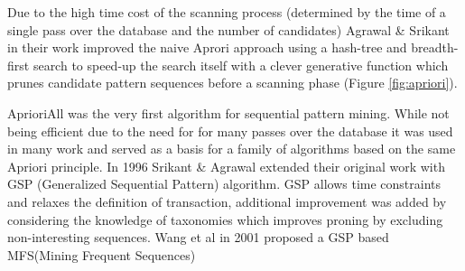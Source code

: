Due to the high time cost of the scanning process (determined by the time of a single pass over the database and the number of candidates)  Agrawal \& Srikant in their work improved the naive Aprori approach using a hash-tree and breadth-first search to speed-up the search itself with a clever generative function which prunes candidate pattern sequences before a scanning phase (Figure \ref{fig:apriori}). 

AprioriAll was the very first algorithm for sequential pattern mining. While not being efficient due to the need for for many passes over the database it was used in many work and served as a basis for a family of algorithms based on the same Apriori principle. In 1996 Srikant \& Agrawal extended their original work with GSP (Generalized Sequential Pattern) algorithm. GSP allows time constraints and relaxes the definition of transaction, additional improvement was added by considering the knowledge of taxonomies which improves proning by excluding non-interesting sequences. Wang et al in 2001 proposed a GSP based MFS(Mining Frequent Sequences) \cite{citeulike:5164952}